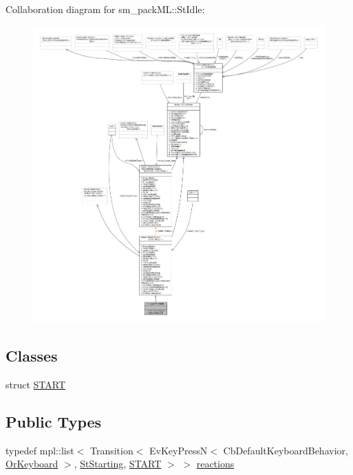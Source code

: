 Collaboration diagram for sm\+\_\+pack\+ML\+:\+:St\+Idle\+:
\nopagebreak
\begin{figure}[H]
\begin{center}
\leavevmode
\includegraphics[width=350pt]{structsm__packML_1_1StIdle__coll__graph}
\end{center}
\end{figure}
\subsection*{Classes}
\begin{DoxyCompactItemize}
\item 
struct \hyperlink{structsm__packML_1_1StIdle_1_1START}{S\+T\+A\+RT}
\end{DoxyCompactItemize}
\subsection*{Public Types}
\begin{DoxyCompactItemize}
\item 
typedef mpl\+::list$<$ Transition$<$ Ev\+Key\+PressN$<$ Cb\+Default\+Keyboard\+Behavior, \hyperlink{classsm__packML_1_1OrKeyboard}{Or\+Keyboard} $>$, \hyperlink{structsm__packML_1_1StStarting}{St\+Starting}, \hyperlink{structsm__packML_1_1StIdle_1_1START}{S\+T\+A\+RT} $>$ $>$ \hyperlink{structsm__packML_1_1StIdle_aaa2867c5d09625334cfd937ddacc4f07}{reactions}
\end{DoxyCompactItemize}
